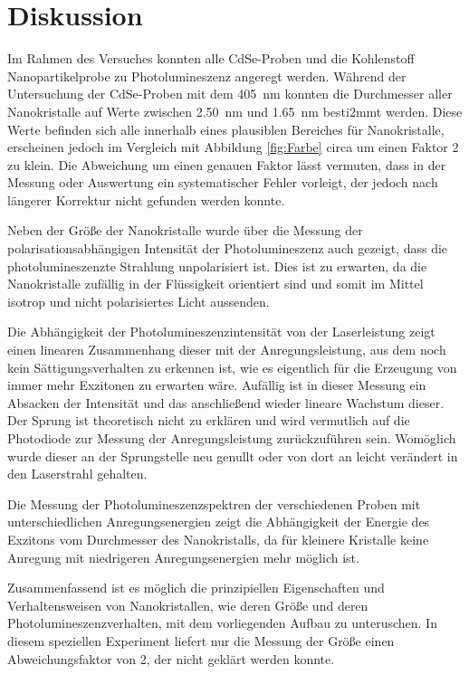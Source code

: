 \newpage
\section{Diskussion}    
    Im Rahmen des Versuches konnten alle CdSe-Proben und die Kohlenstoff Nanopartikelprobe zu Photolumineszenz angeregt werden. Während der Untersuchung der CdSe-Proben mit dem \SI{405}{\nano\metre} konnten
    die Durchmesser aller Nanokristalle auf Werte zwischen \SI{2.50}{\nano\metre} und \SI{1.65}{\nano\metre} besti2mmt werden. Diese Werte befinden sich alle innerhalb eines plausiblen Bereiches für 
    Nanokristalle, erscheinen jedoch im Vergleich mit Abbildung \ref{fig:Farbe} circa um einen Faktor 2 zu klein. Die Abweichung um einen genauen Faktor lässt vermuten, dass in der Messung oder Auswertung ein 
    systematischer Fehler vorleigt, der jedoch nach längerer Korrektur nicht gefunden werden konnte. 
    
    Neben der Größe der Nanokristalle wurde über die Messung der polarisationsabhängigen Intensität der Photolumineszenz auch gezeigt, dass die photolumineszenzte Strahlung unpolarisiert ist. Dies ist zu 
    erwarten, da die Nanokristalle zufällig in der Flüssigkeit orientiert sind und somit im Mittel isotrop und nicht polarisiertes Licht aussenden.

    Die Abhängigkeit der Photolumineszenzintensität von der Laserleistung zeigt einen linearen Zusammenhang dieser mit der Anregungsleistung, aus dem noch kein Sättigungsverhalten zu erkennen ist, wie es 
    eigentlich für die Erzeugung von immer mehr Exzitonen zu erwarten wäre. Aufällig ist in dieser Messung ein Absacken der Intensität und das anschließend wieder lineare Wachstum dieser. Der Sprung ist 
    theoretisch nicht zu erklären und wird vermutlich auf die Photodiode zur Messung der Anregungsleistung zurückzuführen sein. Womöglich wurde dieser an der Sprungstelle neu genullt oder von dort an leicht
    verändert in den Laserstrahl gehalten. 
    
    Die Messung der Photolumineszenzspektren der verschiedenen Proben mit unterschiedlichen Anregungsenergien zeigt die Abhängigkeit der Energie des Exzitons vom Durchmesser des Nanokristalls, da für kleinere 
    Kristalle keine Anregung mit niedrigeren Anregungsenergien mehr möglich ist. 

    Zusammenfassend ist es möglich die prinzipiellen Eigenschaften und Verhaltensweisen von Nanokristallen, wie deren Größe und deren Photolumineszenzverhalten, mit dem vorliegenden Aufbau zu unteruschen.
    In diesem speziellen Experiment liefert nur die Messung der Größe einen Abweichungsfaktor von 2, der nicht geklärt werden konnte.  